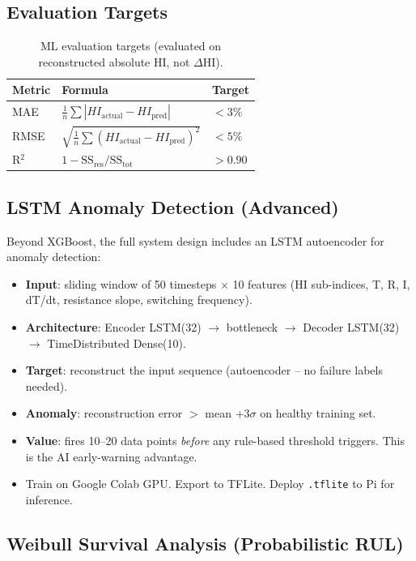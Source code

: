 \documentclass[12pt,a4paper]{article}
\begin{document}
\subsection{Evaluation Targets}

\begin{table}[H]
\centering
\begin{tabular}{lll}
\toprule
\textbf{Metric} & \textbf{Formula} & \textbf{Target} \\
\midrule
MAE   & $\frac{1}{n}\sum|HI_{\text{actual}} - HI_{\text{pred}}|$ & $< 3\%$ \\
RMSE  & $\sqrt{\frac{1}{n}\sum(HI_{\text{actual}} - HI_{\text{pred}})^2}$ & $< 5\%$ \\
R$^2$ & $1 - \text{SS}_\text{res}/\text{SS}_\text{tot}$ & $> 0.90$ \\
\bottomrule
\end{tabular}
\caption{ML evaluation targets (evaluated on reconstructed absolute HI, not $\Delta$HI).}
\end{table}

\subsection{LSTM Anomaly Detection (Advanced)}

Beyond XGBoost, the full system design includes an LSTM autoencoder for anomaly detection:

\begin{itemize}[noitemsep]
  \item \textbf{Input}: sliding window of 50 timesteps $\times$ 10 features (HI sub-indices, T, R, I, dT/dt, resistance slope, switching frequency).
  \item \textbf{Architecture}: Encoder LSTM(32) $\to$ bottleneck $\to$
        Decoder LSTM(32) $\to$ TimeDistributed Dense(10).
  \item \textbf{Target}: reconstruct the input sequence (autoencoder -- no failure labels needed).
  \item \textbf{Anomaly}: reconstruction error $>$ mean $+ 3\sigma$ on healthy training set.
  \item \textbf{Value}: fires 10--20 data points \textit{before} any rule-based threshold triggers. This is the AI early-warning advantage.
  \item Train on Google Colab GPU. Export to TFLite. Deploy \texttt{.tflite} to Pi for inference.
\end{itemize}

\subsection{Weibull Survival Analysis (Probabilistic RUL)}
\end{document}
